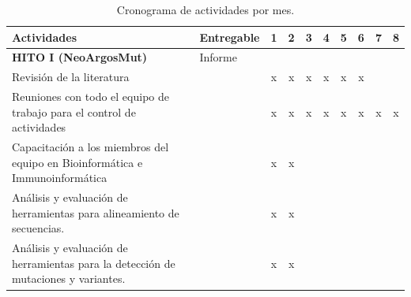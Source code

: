 \documentclass[a4paper,11pt]{article}
\begin{document}
\begin{table}[H]
	\centering
	\setlength{\tabcolsep}{0.6em} %
	{\renewcommand{\arraystretch}{1.7}%
		\caption{Cronograma de actividades por mes.}
		\label{tab:actv}
		{\small
			\begin{tabular}{|p{10cm}|l|c|c|c|c|c|c|c|c|} \hline
				\textbf{Actividades}                                  &   \textbf{Entregable}         & 1 & 2 & 3 & 4 & 5 & 6 & 7 & 8  \\ \hline
				
				\textbf{HITO I (NeoArgosMut)} &  Informe & & & & & & & & \\
				Revisión de la literatura       &                       & x                     & x                      & x                       & x                      &     x                  &      x                  &                                              &    \\
				
				Reuniones con todo el equipo de trabajo para el control de actividades       &                       & x                     & x                      & x                       & x                      &     x                  &      x                  &         x                                     &  x  \\
				
				
				Capacitación a los miembros del equipo en Bioinformática e Immunoinformática       &                       & x                     & x                      &                        &                       &                       &                        &                                              &    \\
				
				
				Análisis y evaluación de herramientas para alineamiento de secuencias.       &                       & x                     & x                      &                        & 
				&                       &                        &                                              &    \\
				
				Análisis y evaluación de herramientas para la detección de mutaciones y variantes.       &       & x                     &                 x      &                        &                     &                       &                        &                                              &    \\
				

\end{tabular}}}
\end{table}
\end{document}
